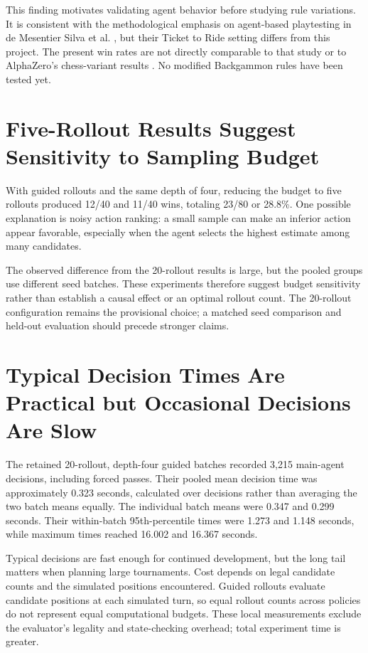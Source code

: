 This finding motivates validating agent behavior before studying rule variations. It is consistent with the methodological emphasis on agent-based playtesting in de Mesentier Silva et al. \cite{silva2017}, but their Ticket to Ride setting differs from this project. The present win rates are not directly comparable to that study or to AlphaZero's chess-variant results \cite{tomasev2020}. No modified Backgammon rules have been tested yet.

\section{Five-Rollout Results Suggest Sensitivity to Sampling Budget}

With guided rollouts and the same depth of four, reducing the budget to five rollouts produced 12/40 and 11/40 wins, totaling 23/80 or 28.8\%. One possible explanation is noisy action ranking: a small sample can make an inferior action appear favorable, especially when the agent selects the highest estimate among many candidates.

The observed difference from the 20-rollout results is large, but the pooled groups use different seed batches. These experiments therefore suggest budget sensitivity rather than establish a causal effect or an optimal rollout count. The 20-rollout configuration remains the provisional choice; a matched seed comparison and held-out evaluation should precede stronger claims.

\section{Typical Decision Times Are Practical but Occasional Decisions Are Slow}

The retained 20-rollout, depth-four guided batches recorded 3,215 main-agent decisions, including forced passes. Their pooled mean decision time was approximately 0.323 seconds, calculated over decisions rather than averaging the two batch means equally. The individual batch means were 0.347 and 0.299 seconds. Their within-batch 95th-percentile times were 1.273 and 1.148 seconds, while maximum times reached 16.002 and 16.367 seconds.

Typical decisions are fast enough for continued development, but the long tail matters when planning large tournaments. Cost depends on legal candidate counts and the simulated positions encountered. Guided rollouts evaluate candidate positions at each simulated turn, so equal rollout counts across policies do not represent equal computational budgets. These local measurements exclude the evaluator's legality and state-checking overhead; total experiment time is greater.

